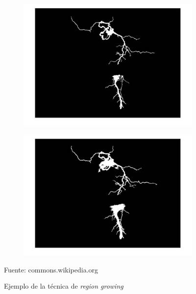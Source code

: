 \begin{figure}[H]
\begin{subfigure}[t]{2.5in}
		\label{regionGrowing3}
	\end{subfigure}	
	\begin{subfigure}[t]{2.5in}
		\centering
		\includegraphics[width=.9\textwidth]{./imagenes/regionGrowing4}
		\label{regionGrowing4}
	\end{subfigure}
	\begin{subfigure}[t]{2.5in}
		\centering
		\includegraphics[width=.9\textwidth]{./imagenes/regionGrowing5}
		\label{regionGrowing5}
	\end{subfigure}
	\caption{Ejemplo de la t\'{e}cnica de \textit{region growing}}
	\centering
	\vspace{2 mm}
	\label{regionGrowingEntera}
	Fuente: commons.wikipedia.org
\end{figure}

